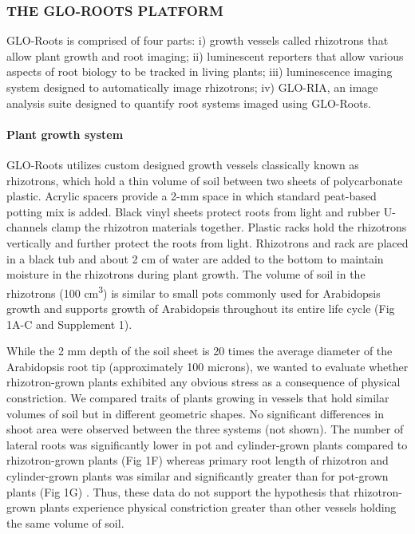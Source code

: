 \documentclass[]{article}
\begin{document}
\subsubsection{THE GLO-ROOTS PLATFORM}\label{the-glo-roots-platform}

GLO-Roots is comprised of four parts: i) growth vessels called
rhizotrons that allow plant growth and root imaging; ii) luminescent
reporters that allow various aspects of root biology to be tracked in
living plants; iii) luminescence imaging system designed to
automatically image rhizotrons; iv) GLO-RIA, an image analysis suite
designed to quantify root systems imaged using GLO-Roots.

\paragraph{Plant growth system}\label{plant-growth-system}

GLO-Roots utilizes custom designed growth vessels classically known as
rhizotrons, which hold a thin volume of soil between two sheets of
polycarbonate plastic. Acrylic spacers provide a 2-mm space in which
standard peat-based potting mix is added. Black vinyl sheets protect
roots from light and rubber U-channels clamp the rhizotron materials
together. Plastic racks hold the rhizotrons vertically and further
protect the roots from light. Rhizotrons and rack are placed in a black
tub and about 2 cm of water are added to the bottom to maintain moisture
in the rhizotrons during plant growth. The volume of soil in the
rhizotrons (100 cm\textsuperscript{3}) is similar to small pots commonly
used for Arabidopsis growth and supports growth of Arabidopsis
throughout its entire life cycle (Fig 1A-C and Supplement 1).

While the 2 mm depth of the soil sheet is 20 times the average diameter
of the Arabidopsis root tip (approximately 100 microns), we wanted to
evaluate whether rhizotron-grown plants exhibited any obvious stress as
a consequence of physical constriction. We compared traits of plants
growing in vessels that hold similar volumes of soil but in different
geometric shapes. No significant differences in shoot area were observed
between the three systems (not shown). The number of lateral roots was
significantly lower in pot and cylinder-grown plants compared to
rhizotron-grown plants (Fig 1F) whereas primary root length of rhizotron
and cylinder-grown plants was similar and significantly greater than for
pot-grown plants (Fig 1G) . Thus, these data do not support the
hypothesis that rhizotron-grown plants experience physical constriction
greater than other vessels holding the same volume of soil.
\end{document}
